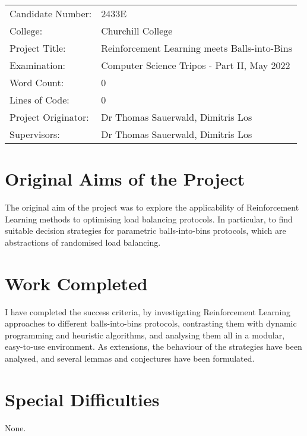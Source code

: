 
\begin{proforma}      


\begin{table}[h]
\begin{tabular}{ll}
Candidate Number:  & 2433E \\
College: & Churchill College \\
Project Title:    &  Reinforcement Learning meets Balls-into-Bins  \\
Examination:  & Computer Science Tripos - Part II, May 2022   \\
Word Count:  & 0  \\
Lines of Code: & 0 \\
Project Originator: & Dr Thomas Sauerwald, Dimitris Los \\
Supervisors: & Dr Thomas Sauerwald, Dimitris Los 
\end{tabular}
\end{table}

\section*{Original Aims of the Project}

The original aim of the project was to explore the applicability of Reinforcement Learning methods to optimising load balancing protocols. In particular, to find suitable decision strategies for parametric balls-into-bins protocols, which are abstractions of randomised load balancing.

\section*{Work Completed}

I have completed the success criteria, by investigating Reinforcement Learning approaches to different balls-into-bins protocols, contrasting them with dynamic programming and heuristic algorithms, and analysing them all in a modular, easy-to-use environment. As extensions, the behaviour of the strategies have been analysed, and several lemmas and conjectures have been formulated.

\section*{Special Difficulties}

None.

\end{proforma}
